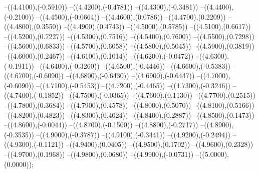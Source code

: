 {	--({\sx*(4.4100)},{\sy*(-0.5910)})
	--({\sx*(4.4200)},{\sy*(-0.4781)})
	--({\sx*(4.4300)},{\sy*(-0.3481)})
	--({\sx*(4.4400)},{\sy*(-0.2100)})
	--({\sx*(4.4500)},{\sy*(-0.0664)})
	--({\sx*(4.4600)},{\sy*(0.0786)})
	--({\sx*(4.4700)},{\sy*(0.2209)})
	--({\sx*(4.4800)},{\sy*(0.3550)})
	--({\sx*(4.4900)},{\sy*(0.4743)})
	--({\sx*(4.5000)},{\sy*(0.5785)})
	--({\sx*(4.5100)},{\sy*(0.6617)})
	--({\sx*(4.5200)},{\sy*(0.7227)})
	--({\sx*(4.5300)},{\sy*(0.7516)})
	--({\sx*(4.5400)},{\sy*(0.7600)})
	--({\sx*(4.5500)},{\sy*(0.7298)})
	--({\sx*(4.5600)},{\sy*(0.6833)})
	--({\sx*(4.5700)},{\sy*(0.6058)})
	--({\sx*(4.5800)},{\sy*(0.5045)})
	--({\sx*(4.5900)},{\sy*(0.3819)})
	--({\sx*(4.6000)},{\sy*(0.2467)})
	--({\sx*(4.6100)},{\sy*(0.1014)})
	--({\sx*(4.6200)},{\sy*(-0.0472)})
	--({\sx*(4.6300)},{\sy*(-0.1911)})
	--({\sx*(4.6400)},{\sy*(-0.3260)})
	--({\sx*(4.6500)},{\sy*(-0.4446)})
	--({\sx*(4.6600)},{\sy*(-0.5383)})
	--({\sx*(4.6700)},{\sy*(-0.6090)})
	--({\sx*(4.6800)},{\sy*(-0.6430)})
	--({\sx*(4.6900)},{\sy*(-0.6447)})
	--({\sx*(4.7000)},{\sy*(-0.6090)})
	--({\sx*(4.7100)},{\sy*(-0.5453)})
	--({\sx*(4.7200)},{\sy*(-0.4465)})
	--({\sx*(4.7300)},{\sy*(-0.3246)})
	--({\sx*(4.7400)},{\sy*(-0.1852)})
	--({\sx*(4.7500)},{\sy*(-0.0365)})
	--({\sx*(4.7600)},{\sy*(0.1130)})
	--({\sx*(4.7700)},{\sy*(0.2515)})
	--({\sx*(4.7800)},{\sy*(0.3684)})
	--({\sx*(4.7900)},{\sy*(0.4578)})
	--({\sx*(4.8000)},{\sy*(0.5070)})
	--({\sx*(4.8100)},{\sy*(0.5166)})
	--({\sx*(4.8200)},{\sy*(0.4823)})
	--({\sx*(4.8300)},{\sy*(0.4024)})
	--({\sx*(4.8400)},{\sy*(0.2887)})
	--({\sx*(4.8500)},{\sy*(0.1473)})
	--({\sx*(4.8600)},{\sy*(-0.0044)})
	--({\sx*(4.8700)},{\sy*(-0.1500)})
	--({\sx*(4.8800)},{\sy*(-0.2717)})
	--({\sx*(4.8900)},{\sy*(-0.3535)})
	--({\sx*(4.9000)},{\sy*(-0.3787)})
	--({\sx*(4.9100)},{\sy*(-0.3441)})
	--({\sx*(4.9200)},{\sy*(-0.2494)})
	--({\sx*(4.9300)},{\sy*(-0.1121)})
	--({\sx*(4.9400)},{\sy*(0.0405)})
	--({\sx*(4.9500)},{\sy*(0.1702)})
	--({\sx*(4.9600)},{\sy*(0.2328)})
	--({\sx*(4.9700)},{\sy*(0.1968)})
	--({\sx*(4.9800)},{\sy*(0.0680)})
	--({\sx*(4.9900)},{\sy*(-0.0731)})
	--({\sx*(5.0000)},{\sy*(0.0000)});
}
